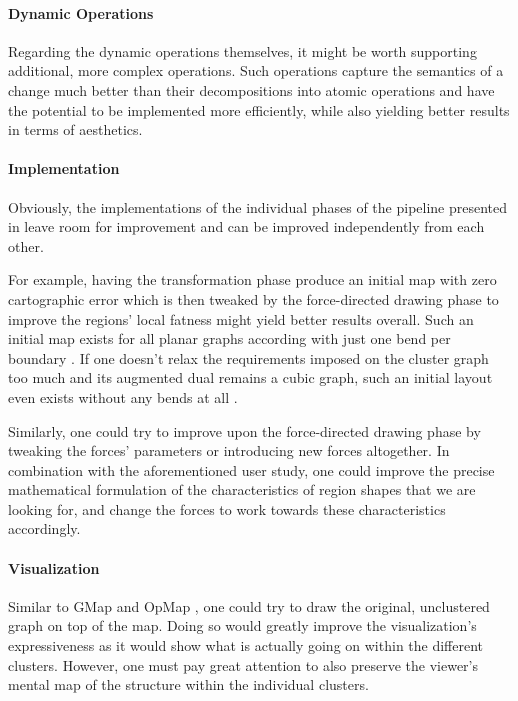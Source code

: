 \paragraph{Dynamic Operations}

Regarding the dynamic operations themselves, it might be worth supporting additional, more complex operations.
Such operations capture the semantics of a change much better than their decompositions into atomic operations and have the potential to be implemented more efficiently, while also yielding better results in terms of aesthetics.


\paragraph{Implementation}

Obviously, the implementations of the individual phases of the pipeline presented in  leave room for improvement and can be improved independently from each other.

For example, having the transformation phase produce an initial map with zero cartographic error which is then tweaked by the force-directed drawing phase to improve the regions' local fatness might yield better results overall.
Such an initial map exists for all planar graphs according with just one bend per boundary \cite{kleist2019planar}.
If one doesn't relax the requirements imposed on the cluster graph too much and its augmented dual remains a cubic graph, such an initial layout even exists without any bends at all \cite{thomassen1992plane}.

Similarly, one could try to improve upon the force-directed drawing phase by tweaking the forces' parameters or introducing new forces altogether.
In combination with the aforementioned user study, one could improve the precise mathematical formulation of the characteristics of region shapes that we are looking for, and change the forces to work towards these characteristics accordingly.


\paragraph{Visualization}

Similar to GMap \cite{gansner2009gmap} and OpMap \cite{schmettow2017}, one could try to draw the original, unclustered graph on top of the map.
Doing so would greatly improve the visualization's expressiveness as it would show what is actually going on within the different clusters.
However, one must pay great attention to also preserve the viewer's mental map of the structure within the individual clusters.


